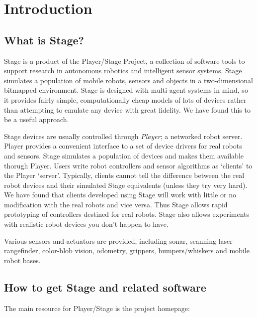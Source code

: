 \documentclass[11pt,twoside]{report}
\def\HOMEPAGE {{\tt http://playerstage.sourceforge.net}}
\begin{document}
\setcounter{page}{0}


\chapter{Introduction}

  \section{What is Stage?}

    Stage is a product of the Player/Stage Project, a collection of
    software tools to support research in autonomous robotics and
    intelligent sensor systems.  Stage simulates a population of
    mobile robots, sensors and objects in a two-dimensional bitmapped
    environment. Stage is designed with multi-agent systems in mind,
    so it provides fairly simple, computationally cheap models of lots
    of devices rather than attempting to emulate any device with great
    fidelity. We have found this to be a useful approach.

    Stage devices are usually controlled through \emph{Player}; a
    networked robot server. Player provides a convenient interface to
    a set of device drivers for real robots and sensors. Stage
    simulates a population of devices and makes them available thorugh
    Player. Users
    write robot controllers and sensor algorithms as `clients' to the
    Player `server'. Typically, clients cannot tell the difference
    between the real robot devices and their simulated Stage
    equivalents (unless they try very hard). We have found that
    clients developed using Stage will work with little or no
    modification with the real robots and vice versa. Thus Stage
    allows rapid prototyping of controllers destined for real
    robots. Stage also allows experiments with realistic robot devices
    you don't happen to have.
  
    Various sensors and actuators are provided, including sonar,
    scanning laser rangefinder, color-blob vision, odometry, grippers,
    bumpers/whiskers and mobile robot bases.

  \section{How to get Stage and related software}

   The main resource for Player/Stage is the project
    homepage:\\\\ \indent \HOMEPAGE\\
	
\end{document}
